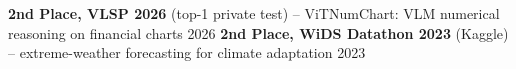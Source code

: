 \vspace{5pt}
\begin{cvhonors}
  \cvhonor
    {\textbf{2nd Place, VLSP 2026} (top-1 private test) -- ViTNumChart: VLM numerical reasoning on financial charts}
    {2026}
  \cvhonor
    {\textbf{2nd Place, WiDS Datathon 2023} (Kaggle) -- extreme-weather forecasting for climate adaptation}
    {2023}
\end{cvhonors}
\par\vspace{10pt}
